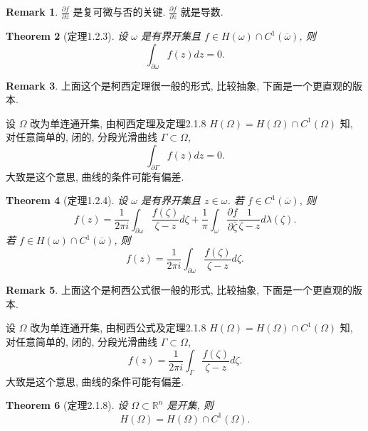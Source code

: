 \documentclass[a4paper,11pt]{article}
\newtheorem{theorem}{Theorem}[section]
\theoremstyle{definition}
\newtheorem{remark}[theorem]{Remark}
\begin{document}
\begin{remark}
    $ \frac{\partial f}{\partial \overline{z}} $ 是复可微与否的关键.
    $ \frac{\partial f}{\partial z} $ 就是导数.
\end{remark}

\begin{theorem}[定理1.2.3]
    设 $ \omega $ 是有界开集且 $ f \in H(\omega) \cap C^1(\overline{\omega}) $, 则
    $$
        \int_{\partial \omega} f(z) dz = 0.
    $$
\end{theorem}

\begin{remark}
    上面这个是柯西定理很一般的形式, 比较抽象, 下面是一个更直观的版本.
    
    设 $ \Omega $ 改为单连通开集, 由柯西定理及定理2.1.8 $ H(\Omega) = H(\Omega) \cap C^1(\Omega) $ 知, 
    对任意简单的, 闭的, 分段光滑曲线 $ \Gamma \subset \Omega $,
    $$
        \int_{\partial \Gamma} f(z) dz = 0.
    $$
    大致是这个意思, 曲线的条件可能有偏差.
\end{remark}

\begin{theorem}[定理1.2.4] \label{1.2.4}
    设 $ \omega $ 是有界开集且 $ z \in \omega $. 若 $ f \in C^1(\overline{\omega}) $, 则
    $$
        f(z) = \frac{1}{2 \pi i} \int_{\partial \omega} \frac{f(\zeta)}{ \zeta - z} d\zeta
                + \frac{1}{\pi} \int_{\omega} \frac{\partial f}{\partial \overline{\zeta}} 
                    \frac{1}{ \zeta - z} d\lambda(\zeta).
    $$
    若 $ f \in H(\omega) \cap C^1(\overline{\omega}) $, 则
    $$
        f(z) = \frac{1}{2 \pi i} \int_{\partial \omega} \frac{f(\zeta)}{ \zeta - z} d\zeta.
    $$
\end{theorem}

\begin{remark}
    上面这个是柯西公式很一般的形式, 比较抽象, 下面是一个更直观的版本.
        
    设 $ \Omega $ 改为单连通开集, 由柯西公式及定理2.1.8 $ H(\Omega) = H(\Omega) \cap C^1(\Omega) $ 知, 
    对任意简单的, 闭的, 分段光滑曲线 $ \Gamma \subset \Omega $,
    $$
        f(z) = \frac{1}{2 \pi i} \int_{\Gamma} \frac{f(\zeta)}{ \zeta - z} d\zeta.
    $$
    大致是这个意思, 曲线的条件可能有偏差.
\end{remark}

\begin{theorem}[定理2.1.8] \label{2.1.8}
    设 $ \Omega \subset \mathbb{R}^n $ 是开集, 则
    $$
        H(\Omega) = H(\Omega) \cap C^1(\Omega).
    $$
\end{theorem}
\end{document}
